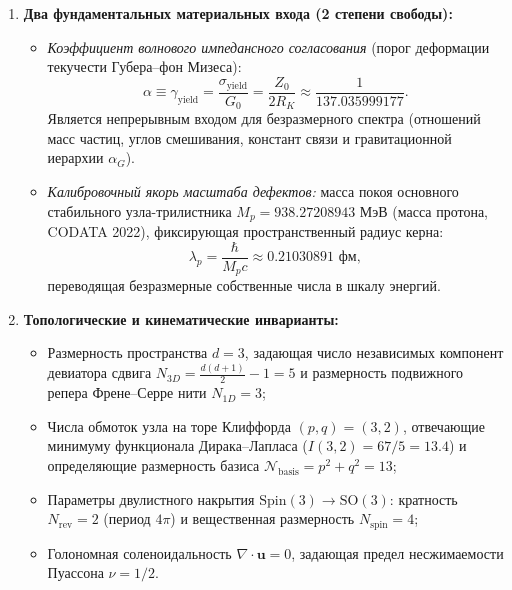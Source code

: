 \documentclass[11pt,a4paper]{article}
\theoremstyle{definition}
\theoremstyle{remark}
\begin{document}
\begin{enumerate}
\item \textbf{Два фундаментальных материальных входа (2 степени свободы):}
\begin{itemize}
	\item \textit{Коэффициент волнового импедансного согласования} (порог деформации текучести Губера--фон Мизеса):
\begin{equation}
	\alpha \equiv \gamma_{\mathrm{yield}} = \frac{\sigma_{\mathrm{yield}}}{G_0} = \frac{Z_0}{2 R_K} \approx \frac{1}{137.035999177}.
	\label{eq:alpha_impedance_def}
\end{equation}
	Является непрерывным входом для безразмерного спектра (отношений масс частиц, углов смешивания, констант связи и гравитационной иерархии $\alpha_G$).
	\item \textit{Калибровочный якорь масштаба дефектов:} масса покоя основного стабильного узла-трилистника $M_p = 938.27208943\text{ МэВ}$ (масса протона, CODATA 2022), фиксирующая пространственный радиус керна:
\begin{equation}
	\lambda_p = \frac{\hbar}{M_p c} \approx 0.21030891\text{ фм},
	\label{eq:lambda_p_anchor_def}
\end{equation}
	переводящая безразмерные собственные числа в шкалу энергий.
\end{itemize}
		
\item \textbf{Топологические и кинематические инварианты:}
\begin{itemize}
	\item Размерность пространства $d = 3$, задающая число независимых компонент девиатора сдвига $N_{3D} = \frac{d(d+1)}{2} - 1 = 5$ и размерность подвижного репера Френе--Серре нити $N_{1D} = 3$;
	\item Числа обмоток узла на торе Клиффорда $(p, q) = (3, 2)$, отвечающие минимуму функционала Дирака--Лапласа ($I(3,2) = 67/5 = 13.4$) и определяющие размерность базиса $\mathcal{N}_{\mathrm{basis}} = p^2 + q^2 = 13$;
	\item Параметры двулистного накрытия $\mathrm{Spin}(3) \to \mathrm{SO}(3)$: кратность $N_{\mathrm{rev}} = 2$ (период $4\pi$) и вещественная размерность $N_{\mathrm{spin}} = 4$;
	\item Голономная соленоидальность $\nabla \cdot \mathbf{u} = 0$, задающая предел несжимаемости Пуассона $\nu = 1/2$.
\end{itemize}
		

\end{enumerate}
\end{document}
